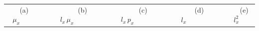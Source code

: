 \documentclass[11pt,fleqn,oneside]{book}
\begin{document}
\begin{enumerate}
\vspace{0.35cm}
\small
\begin{center}
\begin{tabular}{c c c c c}
(a) $\mu_x\;\;\;\;\;\;\;\;$ & 
$\;\;\;\;\;\;\;\;$(b) ${l_x\,\mu_x}\;\;\;\;\;\;\;\;$ &
$\;\;\;\;\;\;\;\;$(c) ${l_x\,p_x}\;\;\;\;\;\;\;\;$ & 
$\;\;\;\;\;\;\;\;$(d) ${l_x} \;\;\;\;\;\;\;\;$ &
$\;\;\;\;\;\;\;\;$(e) ${l_x^2}$ 
\end{tabular}
\end{center}

\end{enumerate}

\newpage

\end{document}
